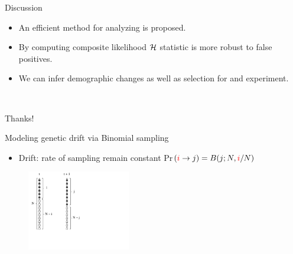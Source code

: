 \documentclass[t]{beamer} %
\begin{document}
\begin{frame}{ Discussion}
	\begin{itemize}
		\item An efficient method for analyzing  is proposed.
		\pause
		\item By computing composite likelihood ${\cal H}$ statistic is more robust 
		to false positives.	
		\pause 
		\item We can infer demographic changes as well as selection for and 
		experiment.
	\end{itemize}
\end{frame}

\begin{frame}{\ }
	\vspace{1	in}
	\begin{center}
		\huge{Thanks!}\\
	\end{center}
	
\end{frame}


\begin{frame}{ Modeling genetic drift  via Binomial sampling}
	\begin{itemize}
		\item Drift: rate of sampling remain constant  
		Pr$(\textcolor{red}{i}\rightarrow 
		j)=B(j;N,\textcolor{red}{i}/N)$
	\end{itemize}
	
	\begin{figure}
		\includegraphics[trim={.05in 0in 5.0in 
			0.in},clip,width=0.4\textwidth]{../figures/drift.pdf}
	\end{figure}
\end{frame}	
\end{document}
